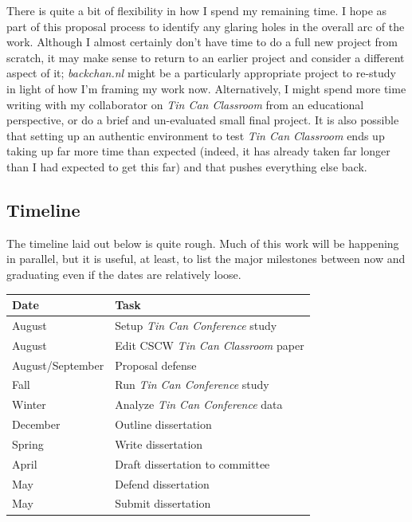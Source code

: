 \documentclass{tufte-handout}
\begin{document}
There is quite a bit of flexibility in how I spend my remaining time. I hope as part of this proposal process to identify any glaring holes in the overall arc of the work. Although I almost certainly don't have time to do a full new project from scratch, it may make sense to return to an earlier project and consider a different aspect of it; \emph{backchan.nl} might be a particularly appropriate project to re-study in light of how I'm framing my work now. Alternatively, I might spend more time writing with my collaborator on \emph{Tin Can Classroom} from an educational perspective, or do a brief and un-evaluated small final project. It is also possible that setting up an authentic environment to test \emph{Tin Can Classroom} ends up taking up far more time than expected (indeed, it has already taken far longer than I had expected to get this far) and that pushes everything else back.



\subsection{Timeline}

The timeline laid out below is quite rough. Much of this work will be happening in parallel, but it is useful, at least, to list the major milestones between now and graduating even if the dates are relatively loose.

\vspace{1em}
\begin{tabular}{ll}
\toprule
Date & Task \\
\midrule

August				& Setup \emph{Tin Can Conference} study \\
August				& Edit CSCW \emph{Tin Can Classroom} paper \\
August/September	& Proposal defense \\
Fall				& Run \emph{Tin Can Conference} study \\
Winter	 			& Analyze \emph{Tin Can Conference} data \\
December			& Outline dissertation \\
Spring				& Write dissertation \\
April				& Draft dissertation to committee \\
May 				& Defend dissertation \\
May					& Submit dissertation \\
\bottomrule

\end{tabular}
\end{document}
